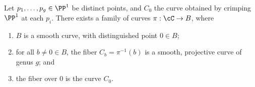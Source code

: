 \begin{lemma}\label{specialization to cuspidal curve}
Let $p_1,\dots,p_g \in \PP^1$ be distinct points, and $C_0$ the curve obtained by 
crimping $\PP^1$ at each $p_i$. There exists a family of curves $\pi : \cC \to B$, where
\begin{enumerate}
\item $B$ is a smooth curve, with distinguished point $0 \in B$;
\item for all $b \neq 0 \in B$, the fiber $C_b = \pi^{-1}(b)$ is a smooth, projective curve of genus $g$;  and
\item the fiber over $0$ is the curve $C_0$.
\end{enumerate}
\end{lemma}




